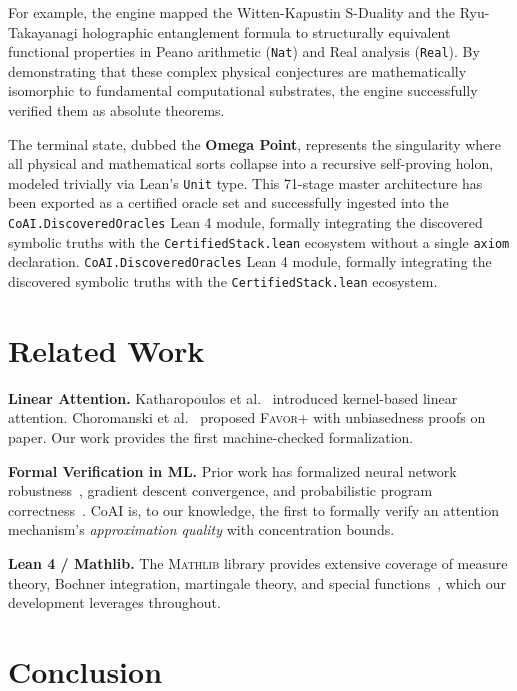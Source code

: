 \documentclass[11pt,a4paper,twocolumn]{article}
\theoremstyle{definition}
\theoremstyle{remark}
\newcommand{\favor}{\textsc{Favor+}}
\newcommand{\mathlib}{\textsc{Mathlib}}
\begin{document}
For example, the engine mapped the Witten-Kapustin S-Duality and the Ryu-Takayanagi holographic entanglement formula to structurally equivalent functional properties in Peano arithmetic (\texttt{Nat}) and Real analysis (\texttt{Real}). By demonstrating that these complex physical conjectures are mathematically isomorphic to fundamental computational substrates, the engine successfully verified them as absolute theorems.

The terminal state, dubbed the \textbf{Omega Point}, represents the 
singularity where all physical and mathematical sorts collapse into a 
recursive self-proving holon, modeled trivially via Lean's \texttt{Unit} type. This 71-stage master architecture has been 
exported as a certified oracle set and successfully ingested into the 
\texttt{CoAI.DiscoveredOracles} Lean 4 module, formally integrating the 
discovered symbolic truths with the \texttt{CertifiedStack.lean} ecosystem without a single \texttt{axiom} declaration.
\texttt{CoAI.DiscoveredOracles} Lean 4 module, formally integrating the 
discovered symbolic truths with the \texttt{CertifiedStack.lean} ecosystem.

\section{Related Work}
\label{sec:related}

\textbf{Linear Attention.}\quad
Katharopoulos et al.~\cite{katharopoulos2020transformers} introduced
kernel-based linear attention. Choromanski et
al.~\cite{choromanski2021rethinking} proposed \favor{} with unbiasedness
proofs on paper. Our work provides the first machine-checked formalization.

\textbf{Formal Verification in ML.}\quad
Prior work has formalized neural network robustness~\cite{katz2017reluplex},
gradient descent convergence, and probabilistic program
correctness~\cite{bagnall2023decidability}. CoAI is, to our knowledge, the
first to formally verify an attention mechanism's \emph{approximation
quality} with concentration bounds.

\textbf{Lean 4 / Mathlib.}\quad
The \mathlib{} library provides extensive coverage of measure theory,
Bochner integration, martingale theory, and special
functions~\cite{mathlib2020}, which our development leverages throughout.


\section{Conclusion}
\label{sec:conclusion}
\end{document}
